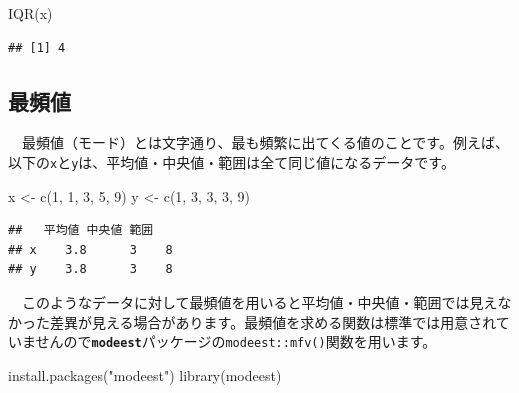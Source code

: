 \documentclass[
  12pt,
]{book}
\newenvironment{Shaded}{\begin{snugshade}}{\end{snugshade}}
\newcommand{\DecValTok}[1]{\textcolor[rgb]{0.00,0.00,0.81}{#1}}
\newcommand{\FunctionTok}[1]{\textcolor[rgb]{0.00,0.00,0.00}{#1}}
\newcommand{\NormalTok}[1]{#1}
\newcommand{\OtherTok}[1]{\textcolor[rgb]{0.56,0.35,0.01}{#1}}
\newcommand{\StringTok}[1]{\textcolor[rgb]{0.31,0.60,0.02}{#1}}
\begin{document}
\begin{Shaded}
\begin{Highlighting}[numbers=left,,]
\FunctionTok{IQR}\NormalTok{(x)}
\end{Highlighting}
\end{Shaded}

\begin{verbatim}
## [1] 4
\end{verbatim}

\hypertarget{ux6700ux983bux5024}{%
\subsection{\texorpdfstring{最頻値}{最頻値}}\label{ux6700ux983bux5024}}

　最頻値（モード）とは文字通り、最も頻繁に出てくる値のことです。例えば、以下の\texttt{x}と\texttt{y}は、平均値・中央値・範囲は全て同じ値になるデータです。

\begin{Shaded}
\begin{Highlighting}[numbers=left,,]
\NormalTok{x }\OtherTok{\textless{}{-}} \FunctionTok{c}\NormalTok{(}\DecValTok{1}\NormalTok{, }\DecValTok{1}\NormalTok{, }\DecValTok{3}\NormalTok{, }\DecValTok{5}\NormalTok{, }\DecValTok{9}\NormalTok{)}
\NormalTok{y }\OtherTok{\textless{}{-}} \FunctionTok{c}\NormalTok{(}\DecValTok{1}\NormalTok{, }\DecValTok{3}\NormalTok{, }\DecValTok{3}\NormalTok{, }\DecValTok{3}\NormalTok{, }\DecValTok{9}\NormalTok{)}
\end{Highlighting}
\end{Shaded}

\begin{verbatim}
##   平均値 中央値 範囲
## x    3.8      3    8
## y    3.8      3    8
\end{verbatim}

　このようなデータに対して最頻値を用いると平均値・中央値・範囲では見えなかった差異が見える場合があります。最頻値を求める関数は標準では用意されていませんので\textbf{\texttt{modeest}}パッケージ\citep{R-modeest}の\texttt{modeest::mfv()}関数を用います。

\begin{Shaded}
\begin{Highlighting}[numbers=left,,]
\FunctionTok{install.packages}\NormalTok{(}\StringTok{"modeest"}\NormalTok{)}
\FunctionTok{library}\NormalTok{(modeest)}
\end{Highlighting}
\end{Shaded}
\end{document}
